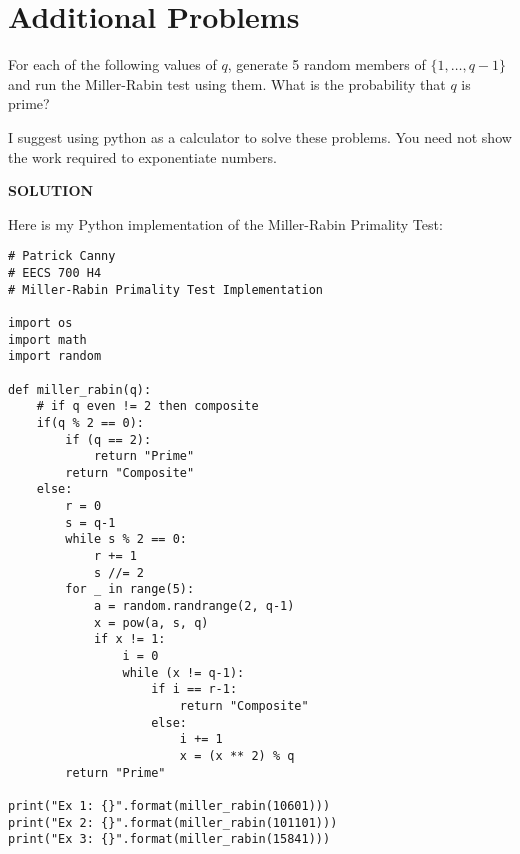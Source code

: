 \documentclass{exam} %
\theoremstyle{plain}
\theoremstyle{definition}
\theoremstyle{remark}
\numberwithin{equation}{section}  %
\newcommand{\sol}{\begin{center}\textbf{SOLUTION}\end{center}}
\begin{document}
\section {Additional Problems}
\begin{questions}
\question For each of the following values of $q$, generate 5 random members
of $\{1,\dots,q-1\}$ and run the Miller-Rabin test using them. What is the
probability that $q$ is prime?

\smallskip

I suggest using python as a calculator to solve these problems. You need not
show the work required to exponentiate numbers.
\sol
Here is my Python implementation of the Miller-Rabin Primality Test:\\
\begin{lstlisting}
# Patrick Canny
# EECS 700 H4
# Miller-Rabin Primality Test Implementation

import os
import math
import random

def miller_rabin(q):
    # if q even != 2 then composite
    if(q % 2 == 0):
        if (q == 2):
            return "Prime"
        return "Composite"
    else:
        r = 0
        s = q-1
        while s % 2 == 0:
            r += 1
            s //= 2
        for _ in range(5):
            a = random.randrange(2, q-1)
            x = pow(a, s, q)
            if x != 1:
                i = 0
                while (x != q-1):
                    if i == r-1:
                        return "Composite"
                    else:
                        i += 1
                        x = (x ** 2) % q
        return "Prime"

print("Ex 1: {}".format(miller_rabin(10601)))
print("Ex 2: {}".format(miller_rabin(101101)))
print("Ex 3: {}".format(miller_rabin(15841)))
\end{lstlisting}

\end{questions}
\end{document}

